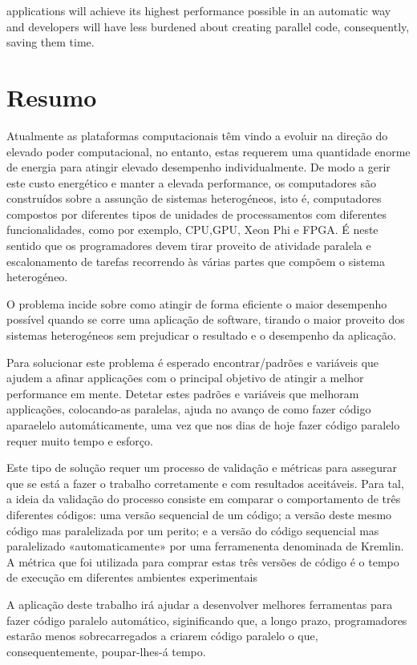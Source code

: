applications will achieve its highest performance possible in an automatic way and developers will have less burdened about creating parallel code, consequently, saving them time.

\chapter*{Resumo}

Atualmente as plataformas computacionais têm vindo a evoluir na direção do elevado poder computacional, no entanto, estas requerem uma quantidade enorme de energia para atingir elevado desempenho individualmente.
De modo a gerir este custo energético e manter a elevada performance, os computadores são construídos sobre a assunção de sistemas heterogéneos, isto é, computadores compostos por diferentes tipos de unidades de processamentos com diferentes funcionalidades, como por exemplo, CPU,GPU, Xeon Phi e FPGA.
É neste sentido que os programadores devem tirar proveito de atividade paralela e escalonamento de tarefas recorrendo às várias partes que compõem o sistema heterogéneo.

O problema incide sobre como atingir de forma eficiente o maior desempenho possível quando se corre uma aplicação de software, tirando o maior proveito dos sistemas heterogéneos sem prejudicar o resultado e o desempenho da aplicação.

Para solucionar este problema é esperado encontrar/padrões e variáveis que ajudem a afinar applicações com o principal objetivo de atingir a melhor performance em mente. Detetar estes padrões e variáveis que melhoram applicações, colocando-as paralelas, ajuda no avanço de como fazer código aparaelelo automáticamente, uma vez que nos dias de hoje fazer código paralelo requer muito tempo e esforço.

Este tipo de solução requer um processo de validação e métricas para assegurar que se está a fazer o trabalho corretamente e com resultados aceitáveis. Para tal, a ideia da validação do processo consiste em comparar o comportamento de três diferentes códigos: uma versão sequencial de um código; a versão deste mesmo código mas paralelizada por um perito; e a versão do código sequencial mas paralelizado «automaticamente» por uma ferramenenta denominada de Kremlin. A métrica que foi utilizada para comprar estas três versões de código é o tempo de execução em diferentes ambientes experimentais

A aplicação deste trabalho irá ajudar a desenvolver melhores ferramentas para fazer código paralelo automático, siginificando que, a longo prazo, programadores estarão menos sobrecarregados a criarem código paralelo o que, consequentemente, poupar-lhes-á tempo.



